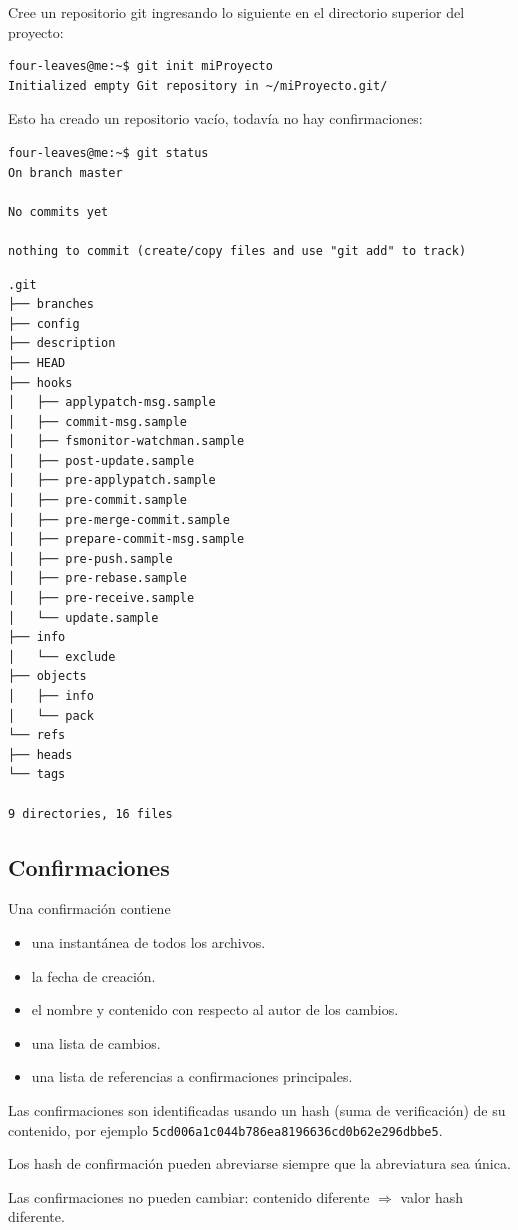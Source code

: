 Cree un repositorio git ingresando lo siguiente en el directorio superior del proyecto:
\begin{verbatim}
four-leaves@me:~$ git init miProyecto
Initialized empty Git repository in ~/miProyecto.git/
\end{verbatim}
Esto ha creado un repositorio vacío, todavía no hay confirmaciones:
\begin{verbatim}
four-leaves@me:~$ git status
On branch master

No commits yet

nothing to commit (create/copy files and use "git add" to track)
\end{verbatim}
\begin{verbatim}
.git
├── branches
├── config
├── description
├── HEAD
├── hooks
│   ├── applypatch-msg.sample
│   ├── commit-msg.sample
│   ├── fsmonitor-watchman.sample
│   ├── post-update.sample
│   ├── pre-applypatch.sample
│   ├── pre-commit.sample
│   ├── pre-merge-commit.sample
│   ├── prepare-commit-msg.sample
│   ├── pre-push.sample
│   ├── pre-rebase.sample
│   ├── pre-receive.sample
│   └── update.sample
├── info
│   └── exclude
├── objects
│   ├── info
│   └── pack
└── refs
├── heads
└── tags

9 directories, 16 files
\end{verbatim}

\subsection{Confirmaciones}
Una confirmación contiene
\begin{itemize}
	\item una instantánea de todos los archivos.
	\item la fecha de creación.
	\item el nombre y contenido con respecto al autor de los cambios.
	\item una lista de cambios.
	\item una lista de referencias a confirmaciones principales.
\end{itemize}
Las confirmaciones son identificadas usando un hash (suma de verificación) de su contenido, por ejemplo \texttt{5cd006a1c044b786ea8196636cd0b62e296dbbe5}.

Los hash de confirmación pueden abreviarse siempre que la abreviatura sea única.

Las confirmaciones no pueden cambiar: contenido diferente $\Rightarrow$ valor hash diferente.

